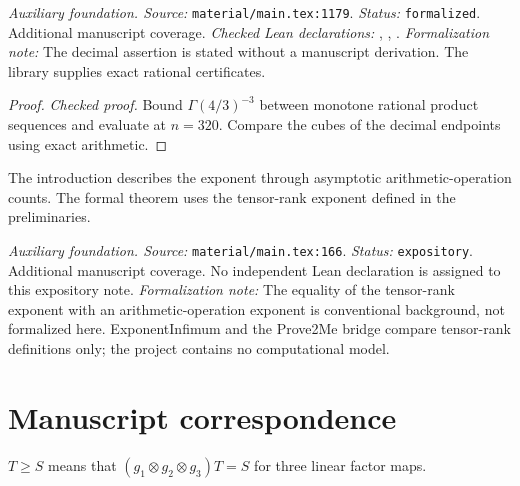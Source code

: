 \noindent\textit{Auxiliary foundation. Source:} \texttt{material/main.tex:1179}.
\textit{Status:} \texttt{formalized}. Additional manuscript coverage.
\textit{Checked Lean declarations:} , , .
\textit{Formalization note:} The decimal assertion is stated without a manuscript derivation. The library supplies exact rational certificates.

\begin{proof}
\leanok
\textit{Checked proof.} Bound $\Gamma(4/3)^{-3}$ between monotone rational product sequences and evaluate at $n=320$. Compare the cubes of the decimal endpoints using exact arithmetic.
\end{proof}

\renewcommand{\thetheorem}{A84}
\begin{remark}
\label{aux:arithmetic-exponent-interpretation}
The introduction describes the exponent through asymptotic arithmetic-operation counts. The formal theorem uses the tensor-rank exponent defined in the preliminaries.
\end{remark}

\noindent\textit{Auxiliary foundation. Source:} \texttt{material/main.tex:166}.
\textit{Status:} \texttt{expository}. Additional manuscript coverage.
No independent Lean declaration is assigned to this expository note.
\textit{Formalization note:} The equality of the tensor-rank exponent with an arithmetic-operation exponent is conventional background, not formalized here. ExponentInfimum and the Prove2Me bridge compare tensor-rank definitions only; the project contains no computational model.

\section{Manuscript correspondence}

\renewcommand{\thetheorem}{2.1}
\begin{equationresult}
\label{eq:restriction}
\leanok
$T\ge S$ means that $(g_1\otimes g_2\otimes g_3)T=S$ for three linear factor maps.
\end{equationresult}


